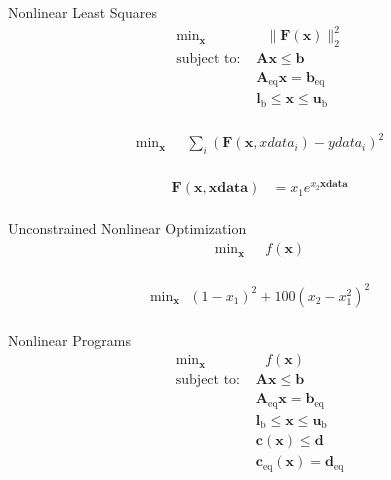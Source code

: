 \documentclass{article}
\begin{document}
Nonlinear Least Squares
\begin{align*}
    \text{min}_{\mathbf{x}}& \text{ } \| \mathbf{F} \left(\mathbf{x}\right) \|_2^2\\
    \mbox{subject to: }& \mathbf{A}\mathbf{x} \le \mathbf{b}\\
                       & \mathbf{A}_{\text{eq}}\mathbf{x} = \mathbf{b}_{\text{eq}}\\
                       & \mathbf{l}_{\text{b}} \le \mathbf{x} \le \mathbf{u}_{\text{b}}\\
\end{align*}

\begin{align*}
\text{min}_{\mathbf{x}}& \text{ } \sum_i \left( \mathbf{F} \left( \mathbf{x}, xdata_i \right) - ydata_i \right)^2\\
\end{align*}

\begin{align*}
\mathbf{F} \left(\mathbf{x},\mathbf{xdata}\right) &= x_1 e^{x_2 \mathbf{xdata}}\\
\end{align*}

Unconstrained Nonlinear Optimization
\begin{align*}
    \text{min}_{\mathbf{x}}& \text{ } f\left(\mathbf{x}\right) \\
\end{align*}

\begin{align*}
    \text{min}_{\mathbf{x}} \text{ } \left(1-x_1\right)^2 + 100\left(x_2 - x_1^2\right)^2\\
\end{align*}

Nonlinear Programs
\begin{align*}
    \text{min}_{\mathbf{x}}& \text{ } f\left(\mathbf{x}\right) \\
    \mbox{subject to: }& \mathbf{A}\mathbf{x} \le \mathbf{b}\\
                       & \mathbf{A}_{\text{eq}}\mathbf{x} = \mathbf{b}_{\text{eq}}\\
                       & \mathbf{l}_{\text{b}} \le \mathbf{x} \le \mathbf{u}_{\text{b}}\\
                       & \mathbf{c}\left(\mathbf{x}\right) \le \mathbf{d}\\
                       & \mathbf{c}_{\text{eq}}\left(\mathbf{x}\right) = \mathbf{d}_{\text{eq}}\\
\end{align*}
\end{document}
